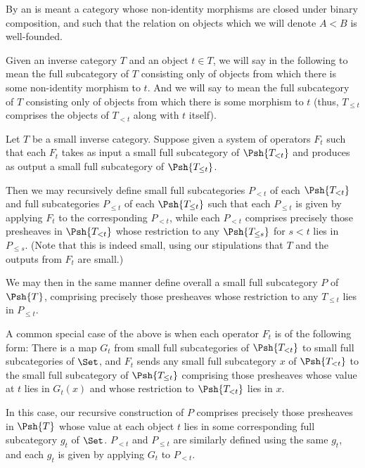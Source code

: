 By an  is meant a category whose non-identity morphisms are closed under binary composition, and such that the relation on objects  which we will denote $A < B$ is well-founded.

Given an inverse category $T$ and an object $t \in T$, we will say  in the following to mean the full subcategory of $T$ consisting only of objects from which there is some non-identity morphism to $t$. And we will say  to mean the full subcategory of $T$ consisting only of objects from which there is some morphism to $t$ (thus, $T_{\leq t}$ comprises the objects of $T_{< t}$ along with $t$ itself).

\begin{construction}
Let $T$ be a small inverse category. Suppose given a system of operators $F_t$ such that each $F_t$ takes as input a small full subcategory of $\Psh{T_{< t}}$ and produces as output a small full subcategory of $\Psh{T_{\leq t}}$.

Then we may recursively define small full subcategories $P_{< t}$ of each $\Psh{T_{< t}}$ and full subcategories $P_{\leq t}$ of each $\Psh{T_{\leq t}}$ such that each $P_{\leq t}$ is given by applying $F_t$ to the corresponding $P_{< t}$, while each $P_{< t}$ comprises precisely those presheaves in $\Psh{T_{< t}}$ whose restriction to any $\Psh{T_{\leq s}}$ for $s < t$ lies in $P_{\leq s}$. (Note that this is indeed small, using our stipulations that $T$ and the outputs from $F_t$ are small.)

We may then in the same manner define overall a small full subcategory $P$ of $\Psh{T}$, comprising precisely those presheaves whose restriction to any $T_{\leq t}$ lies in $P_{\leq t}$.

A common special case of the above is when each operator $F_t$ is of the following form: There is a map $G_t$ from small full subcategories of $\Psh{T_{< t}}$ to small full subcategories of $\Set$, and $F_t$ sends any small full subcategory $x$ of $\Psh{T_{< t}}$ to the small full subcategory of $\Psh{T_{\leq t}}$ comprising those presheaves whose value at $t$ lies in $G_t(x)$ and whose restriction to $\Psh{T_{< t}}$ lies in $x$.

In this case, our recursive construction of $P$ comprises precisely those presheaves in $\Psh{T}$ whose value at each object $t$ lies in some corresponding full subcategory $g_t$ of $\Set$. $P_{< t}$ and $P_{\leq t}$ are similarly defined using the same $g_t$, and each $g_t$ is given by applying $G_t$ to $P_{< t}$.
\end{construction}

